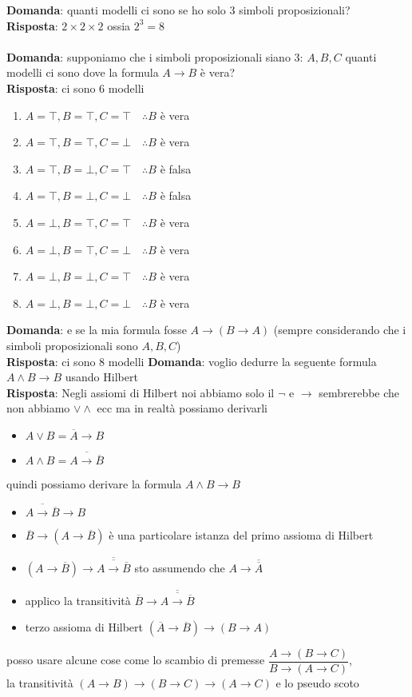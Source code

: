 \documentclass{article}
\begin{document}
\textbf{Domanda}: quanti modelli ci sono se ho solo 3 simboli proposizionali? \\
\textbf{Risposta}: $2 \times 2 \times 2$ ossia $2^3 = 8$\\ \\
\textbf{Domanda}: supponiamo che i simboli proposizionali siano 3: $A, B, C$ quanti modelli ci sono dove la formula $A \rightarrow B$ è vera? \\
\textbf{Risposta}: ci sono 6 modelli
\begin{enumerate}
    \item $A = \top, B = \top, C = \top \quad \therefore B$ è vera
    \item $A = \top, B = \top, C = \bot \quad \therefore B$ è vera
    \item $A = \top, B = \bot, C = \top \quad \therefore B$ è falsa
    \item $A = \top, B = \bot, C = \bot \quad \therefore B$ è falsa
    \item $A = \bot, B = \top, C = \top \quad \therefore B$ è vera
    \item $A = \bot, B = \top, C = \bot \quad \therefore B$ è vera
    \item $A = \bot, B = \bot, C = \top \quad \therefore B$ è vera
    \item $A = \bot, B = \bot, C = \bot \quad \therefore B$ è vera
\end{enumerate}
\textbf{Domanda}: e se la mia formula fosse $A \rightarrow (B \rightarrow A)$ (sempre considerando che i simboli proposizionali sono $A, B, C$) \\
\textbf{Risposta}: ci sono 8 modelli
\textbf{Domanda}: voglio dedurre la seguente formula $A \land B \rightarrow B$ usando Hilbert \\
\textbf{Risposta}: Negli assiomi di Hilbert noi abbiamo solo il $\lnot$ e $\rightarrow$ sembrerebbe che non abbiamo $\lor \land$ ecc ma in realtà possiamo derivarli
\begin{itemize}
    \item $A \lor B = \overline{A} \rightarrow B$
    \item $A \land B = \overline{A \rightarrow \overline{B}}$
\end{itemize}
quindi possiamo derivare la formula $A \land B \rightarrow B$
\begin{itemize}
    \item $\overline{A \rightarrow \overline{B}} \rightarrow B$
    \item $\overline{B} \rightarrow (A \rightarrow \overline{B})$ è una particolare istanza del primo assioma di Hilbert
    \item $(A \rightarrow \overline{B}) \rightarrow \overline{\overline{A \rightarrow \overline{B}}}$ sto assumendo che $A \rightarrow \overline{\overline{A}}$
    \item applico la transitività $\overline{B} \rightarrow \overline{\overline{A \rightarrow \overline{B}}}$
    \item terzo assioma di Hilbert $(\overline{A} \rightarrow \overline{B}) \rightarrow (B \rightarrow A)$
\end{itemize}
posso usare alcune cose come lo scambio di premesse $\dfrac{A \rightarrow (B \rightarrow C)}{B \rightarrow (A \rightarrow C)}$, \\ la transitività $(A \rightarrow B) \rightarrow (B \rightarrow C) \rightarrow (A \rightarrow C)$ e lo pseudo scoto
\end{document}
